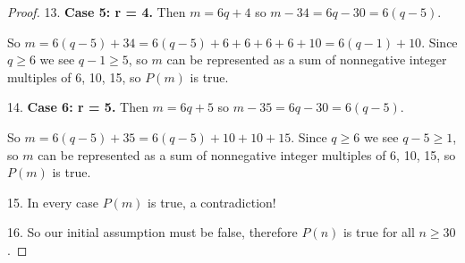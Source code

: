 \documentclass[14pt]{extarticle}
\begin{document}
\begin{proof}
13. \textbf{Case 5: r = 4.} Then $m = 6q + 4$ so $m - 34 = 6q - 30 = 6(q - 5)$. 

So $m = 6(q - 5) + 34 = 6(q - 5) + 6 + 6 + 6 + 6 + 10 = 6(q - 1) + 10$. Since $q \geq 6$ we see $q - 1 \geq 5$, so $m$ can be represented as a sum of nonnegative integer multiples of 6, 10, 15, so $P(m)$ is true.

14. \textbf{Case 6: r = 5.} Then $m = 6q + 5$ so $m - 35 = 6q - 30 = 6(q - 5)$. 

So $m = 6(q - 5) + 35 = 6(q - 5) + 10 + 10 + 15$. Since $q \geq 6$ we see $q - 5 \geq 1$, so $m$ can be represented as a sum of nonnegative integer multiples of 6, 10, 15, so $P(m)$ is true.

15. In every case $P(m)$ is true, a contradiction!

16. So our initial assumption must be false, therefore $P(n)$ is true for all $n \geq 30$.
\end{proof}
\end{document}
